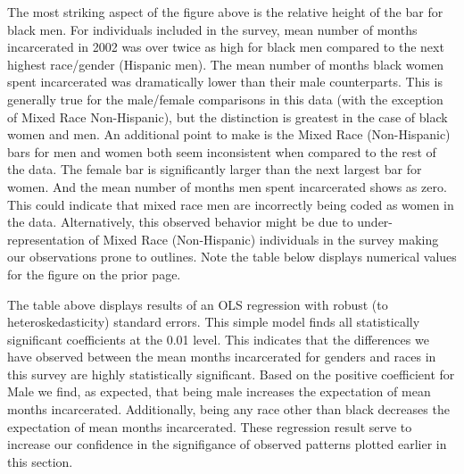 \documentclass{article}
\begin{document}
The most striking aspect of the figure above is the relative height of the bar for black men. For individuals included in the survey, mean number of months incarcerated in 2002 was over twice as high for black men compared to the next highest race/gender (Hispanic men). The mean number of months black women spent incarcerated was dramatically lower than their male counterparts. This is generally true for the male/female comparisons in this data (with the exception of Mixed Race Non-Hispanic), but the distinction is greatest in the case of black women and men. An additional point to make is the Mixed Race (Non-Hispanic) bars for men and women both seem inconsistent when compared to the rest of the data. The female bar is significantly larger than the next largest bar for women. And the mean number of months men spent incarcerated shows as zero. This could indicate that mixed race men are incorrectly being coded as women in the data. Alternatively, this observed behavior might be due to under-representation of Mixed Race (Non-Hispanic) individuals in the survey making our observations prone to outlines. Note the table below displays numerical values for the figure on the prior page.




\newpage




The table above displays results of an OLS regression with robust (to heteroskedasticity) standard errors. This simple model finds all statistically significant coefficients at the 0.01 level. This indicates that the differences we have observed between the mean months incarcerated for genders and races in this survey are highly statistically significant. Based on the positive coefficient for Male we find, as expected, that being male increases the expectation of mean months incarcerated. Additionally, being any race other than black decreases the expectation of mean months incarcerated. These regression result serve to increase our confidence in the signifigance of observed patterns plotted earlier in this section.
\end{document}
